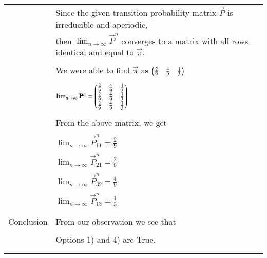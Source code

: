 \begin{longtable}{|l|l|}
		
		& Since the given transition probability matrix $\vec{P}$ is irreducible and aperiodic, \\
		& then $\lim_{n \to \infty} \vec{P}^{n}$ converges to a matrix with all rows identical and equal to $\vec{\pi}$. \\
		& \\
		& We were able to find $\vec{\pi}$ as $\begin{pmatrix}\frac{2}{9} & \frac{4}{9} & \frac{1}{3}\end{pmatrix}$ \\
		& \\
		& $\lim_{n \to \infty} \mathbf{P}^{n} = \begin{pmatrix}\frac{2}{9}&\frac{4}{9}&\frac{1}{3}\\\frac{2}{9}&\frac{4}{9}&\frac{1}{3}\\\frac{2}{9}&\frac{4}{9}&\frac{1}{3}\end{pmatrix}$\\
		& \\
		& From the above matrix, we get \\
		& \\
		& $\lim_{n \to \infty} \vec{P}^{n}_{11} = \frac{2}{9}$ \\
		&\\
		& $\lim_{n \to \infty} \vec{P}^{n}_{21} = \frac{2}{9}$ \\
		&\\
		& $\lim_{n \to \infty} \vec{P}^{n}_{32} = \frac{4}{9}$ \\
		&\\
		& $\lim_{n \to \infty} \vec{P}^{n}_{13} = \frac{1}{3}$ \\
		&\\
		\hline
		\multirow{3}{*}{Conclusion} & \\
		& From our observation we see that \\
		&\\
		& Options 1) and 4) are True.\\
		& \\
		\hline
\caption{}
\label{eq:solutions/2018/dec/106/table1}
	\end{longtable}
\twocolumn
